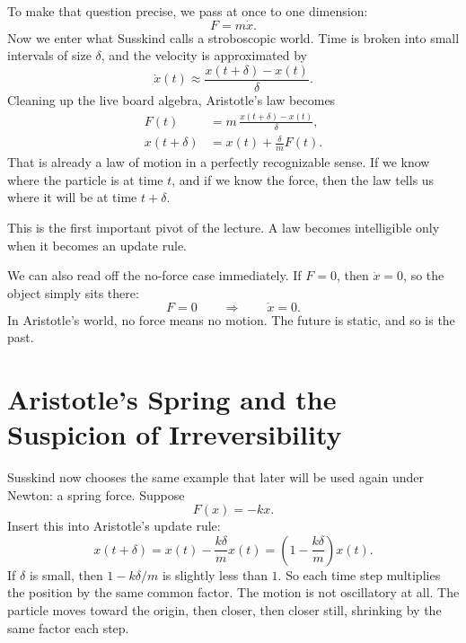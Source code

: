 To make that question precise, we pass at once to one dimension:
\begin{equation}
F=m\dot x.
\end{equation}
Now we enter what Susskind calls a stroboscopic world. Time is broken into small intervals of size \(\delta\), and the velocity is approximated by
\begin{equation}
\dot x(t)\approx \frac{x(t+\delta)-x(t)}{\delta}.
\end{equation}
Cleaning up the live board algebra, Aristotle's law becomes
\begin{align}
F(t)&=m\,\frac{x(t+\delta)-x(t)}{\delta},\\
x(t+\delta)&=x(t)+\frac{\delta}{m}F(t).
\end{align}
That is already a law of motion in a perfectly recognizable sense. If we know where the particle is at time \(t\), and if we know the force, then the law tells us where it will be at time \(t+\delta\).

This is the first important pivot of the lecture. A law becomes intelligible only when it becomes an update rule.

We can also read off the no-force case immediately. If \(F=0\), then \(\dot x=0\), so the object simply sits there:
\begin{equation}
F=0 \qquad \Rightarrow \qquad \dot x=0.
\end{equation}
In Aristotle's world, no force means no motion. The future is static, and so is the past.

\section{Aristotle's Spring and the Suspicion of Irreversibility}

Susskind now chooses the same example that later will be used again under Newton: a spring force. Suppose
\begin{equation}
F(x)=-kx.
\end{equation}
Insert this into Aristotle's update rule:
\begin{equation}
x(t+\delta)=x(t)-\frac{k\delta}{m}x(t)
=\left(1-\frac{k\delta}{m}\right)x(t).
\end{equation}
If \(\delta\) is small, then \(1-k\delta/m\) is slightly less than \(1\). So each time step multiplies the position by the same common factor. The motion is not oscillatory at all. The particle moves toward the origin, then closer, then closer still, shrinking by the same factor each step.

